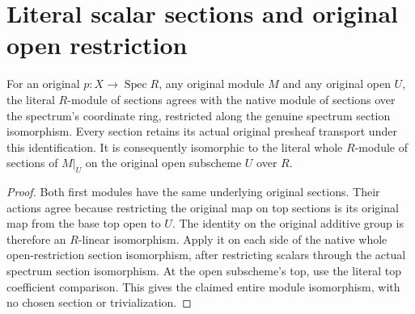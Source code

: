 \section{Literal scalar sections and original open restriction}

\begin{lemma}\label{lem:fc-scalar-module-open-restriction}
\leanok
{}
For an original $p:X\to\operatorname{Spec}R$, any original module $M$
and any original open $U$, the literal $R$-module of sections agrees
with the native module of sections over the spectrum's coordinate
ring, restricted along the genuine spectrum section isomorphism.
Every section retains its actual original presheaf transport under this identification.
It is consequently isomorphic to the literal whole $R$-module of
sections of $M|_U$ on the original open subscheme $U$ over $R$.
\end{lemma}
\begin{proof}
Both first modules have the same underlying original sections. Their
actions agree because restricting the original map on top sections is
its original map from the base top open to $U$. The identity on the
original additive group is therefore an $R$-linear isomorphism.
Apply it on each side of the native whole open-restriction section
isomorphism, after restricting scalars through the actual spectrum
section isomorphism. At the open subscheme's top, use the literal top
coefficient comparison. This gives the claimed entire module
isomorphism, with no chosen section or trivialization.
\end{proof}
